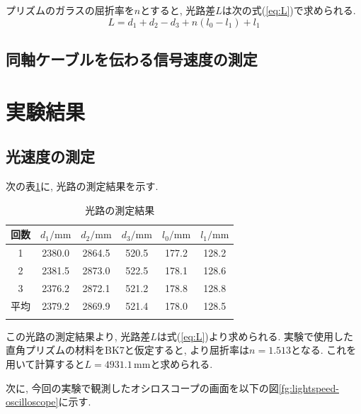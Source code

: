 \documentclass{jarticle}
\begin{document}
プリズムのガラスの屈折率を$n$とすると, 光路差$L$は次の式(\ref{eq:L})で求められる.
\begin{equation}
  \label{eq:L}
  L=d_1+d_2-d_3+n(l_0-l_1)+l_1
\end{equation}


\subsection{同軸ケーブルを伝わる信号速度の測定}




\section{実験結果}


\subsection{光速度の測定}

次の表\ref{tb:lightspeed-distance}に, 光路の測定結果を示す.

\begin{table}[h]
  \centering
  \caption{光路の測定結果}
  \begin{tabular}{cccccc}
    \hline
    回数 & $d_1/\mathrm{mm}$ & $d_2/\mathrm{mm}$ & $d_3/\mathrm{mm}$ & $l_0/\mathrm{mm}$ & $l_1/\mathrm{mm}$ \\
    \hline
    1 & 2380.0 & 2864.5 & 520.5 & 177.2 & 128.2 \\
    2 & 2381.5 & 2873.0 & 522.5 & 178.1 & 128.6 \\
    3 & 2376.2 & 2872.1 & 521.2 & 178.8 & 128.8 \\
    \hline
    平均 & 2379.2 & 2869.9 & 521.4 & 178.0 & 128.5 \\
    \hline
    \label{tb:lightspeed-distance}
  \end{tabular}
\end{table}

この光路の測定結果より, 光路差$L$は式(\ref{eq:L})より求められる.
実験で使用した直角プリズムの材料をBK7と仮定すると, \cite{Glass-Materials}より屈折率は$n=1.513$となる.
これを用いて計算すると$L=4931.1\,\mathrm{mm}$と求められる.

次に, 今回の実験で観測したオシロスコープの画面を以下の図\ref{fg:lightspeed-oscilloscope}に示す.
\end{document}

